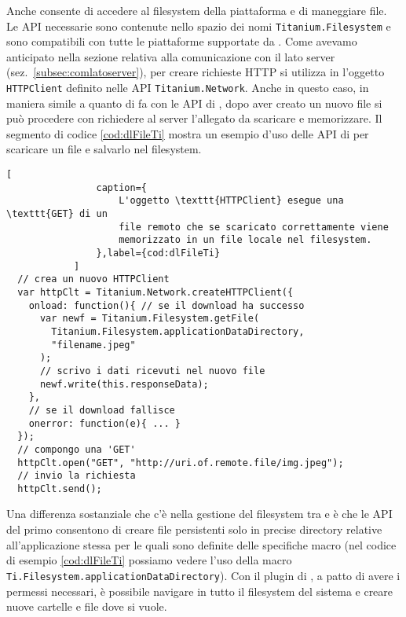             Anche \tisdk{} consente di accedere al filesystem della piattaforma
            e di maneggiare file. Le API necessarie sono contenute nello
            spazio dei nomi \texttt{Titanium.Filesystem} e sono compatibili
            con tutte le piattaforme supportate da \tisdk{}. Come avevamo
            anticipato nella sezione relativa alla comunicazione con il lato
            server (sez.~\ref{subsec:comlatoserver}), per creare richieste HTTP
            si utilizza in \tisdk{} l'oggetto \texttt{HTTPClient} definito nelle
            API \texttt{Titanium.Network}. Anche in questo caso, in maniera
            simile a quanto di fa con le API di \pg{}, dopo aver creato un nuovo
            file si può procedere con richiedere al server l'allegato da
            scaricare e memorizzare. Il segmento di codice \ref{cod:dlFileTi}
            mostra un esempio d'uso delle API di \tisdk{} per scaricare un file
            e salvarlo nel filesystem.
            \begin{lstlisting}[
                caption={
                    L'oggetto \texttt{HTTPClient} esegue una \texttt{GET} di un
                    file remoto che se scaricato correttamente viene
                    memorizzato in un file locale nel filesystem.
                },label={cod:dlFileTi}
            ]
  // crea un nuovo HTTPClient
  var httpClt = Titanium.Network.createHTTPClient({
    onload: function(){ // se il download ha successo
      var newf = Titanium.Filesystem.getFile(
        Titanium.Filesystem.applicationDataDirectory,
        "filename.jpeg"
      );
      // scrivo i dati ricevuti nel nuovo file
      newf.write(this.responseData);
    },
    // se il download fallisce
    onerror: function(e){ ... }
  });
  // compongo una 'GET'
  httpClt.open("GET", "http://uri.of.remote.file/img.jpeg");
  // invio la richiesta
  httpClt.send();
            \end{lstlisting}
            Una differenza sostanziale che c'è nella gestione del filesystem
            tra \tisdk{} e \pg{} è che le API del primo consentono di creare
            file persistenti solo in precise directory relative
            all'applicazione stessa per le quali sono definite delle specifiche
            macro (nel codice di esempio \ref{cod:dlFileTi} possiamo vedere
            l'uso della macro \texttt{Ti.Filesystem.applicationDataDirectory}).
            Con il plugin di \pg{}, a patto di avere i permessi necessari, è
            possibile navigare in tutto il filesystem del sistema e creare nuove
            cartelle e file dove si vuole.

